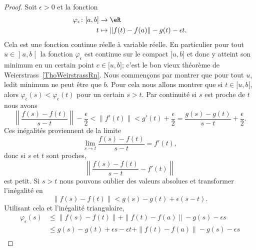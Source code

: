 \begin{proof}
    Soit \( \epsilon>0\) et la fonction
    \begin{equation}
        \begin{aligned}
            \varphi_{\epsilon}\colon \mathopen[ a , b \mathclose]&\to \eR \\
            t&\mapsto \| f(t)-f(a) \|-g(t)-\epsilon t.
        \end{aligned}
    \end{equation}
    Cela est une fonction continue réelle à variable réelle. En particulier pour tout \( u\in\mathopen] a , b \mathclose[\) la fonction \( \varphi_{\epsilon}\) est continue sur le compact \( \mathopen[ u , b \mathclose]\) et donc y atteint son minimum en un certain point \( c\in\mathopen[ u , b \mathclose]\); c'est le bon vieux théorème de Weierstrass~\ref{ThoWeirstrassRn}. Nous commençons par montrer que pour tout \( u\), ledit minimum ne peut être que \( b\). Pour cela nous allons montrer que si \( t\in\mathopen[ u , b [\), alors \( \varphi_{\epsilon}(s)<\varphi_{\epsilon}(t)\) pour un certain \( s>t\). Par continuité si \( s\) est proche de \( t\) nous avons
        \begin{equation}
            \left\|  \frac{ f(s)-f(t) }{ s-t }  \right\|-\frac{ \epsilon }{2}<\| f'(t) \|<g'(t)+\frac{ \epsilon }{2}=\frac{ g(s)-g(t) }{ s-t }+\frac{ \epsilon }{2}.
        \end{equation}
        Ces inégalités proviennent de la limite
        \begin{equation}
            \lim_{s\to t} \frac{ f(s)-f(t) }{ s-t }=f'(t),
        \end{equation}
        donc si \( s\) et \( t\) sont proches,
        \begin{equation}
            \left\| \frac{ f(s)-f(t) }{ s-t }-f'(t) \right\|
        \end{equation}
        est petit. Si \( s>t\) nous pouvons oublier des valeurs absolues et transformer l'inégalité en
        \begin{equation}
            \| f(s)-f(t) \|<g(s)-g(t)+\epsilon(s-t).
        \end{equation}
        Utilisant cela et l'inégalité triangulaire,
        \begin{subequations}
            \begin{align}
                \varphi_{\epsilon}(s)&\leq\| f(s)-f(t) \|+\| f(t)-f(a) \|-g(s)-\epsilon s\\
                &\leq g(s)-g(t)+\epsilon s-\epsilon t+\| f(t)-f(a) \|-g(s)-\epsilon s\\

\end{align}
\end{subequations}
\end{proof}
